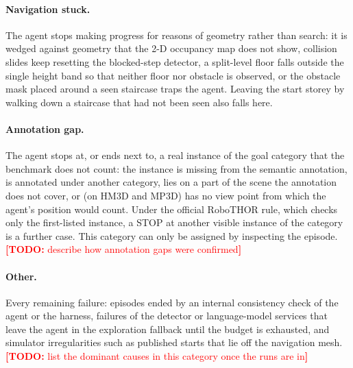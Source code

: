 \documentclass[10pt]{article}
\newcommand{\TODO}[1]{\textcolor{red}{\textbf{[TODO:} #1\textbf{]}}}
\begin{document}
\paragraph{Navigation stuck.} The agent stops making progress for reasons of geometry rather than search: it is wedged against geometry that the 2-D occupancy map does not show, collision slides keep resetting the blocked-step detector, a split-level floor falls outside the single height band so that neither floor nor obstacle is observed, or the obstacle mask placed around a seen staircase traps the agent. Leaving the start storey by walking down a staircase that had not been seen also falls here.

\paragraph{Annotation gap.} The agent stops at, or ends next to, a real instance of the goal category that the benchmark does not count: the instance is missing from the semantic annotation, is annotated under another category, lies on a part of the scene the annotation does not cover, or (on HM3D and MP3D) has no view point from which the agent's position would count. Under the official RoboTHOR rule, which checks only the first-listed instance, a STOP at another visible instance of the category is a further case. This category can only be assigned by inspecting the episode. \TODO{describe how annotation gaps were confirmed}

\paragraph{Other.} Every remaining failure: episodes ended by an internal consistency check of the agent or the harness, failures of the detector or language-model services that leave the agent in the exploration fallback until the budget is exhausted, and simulator irregularities such as published starts that lie off the navigation mesh. \TODO{list the dominant causes in this category once the runs are in}
\end{document}
